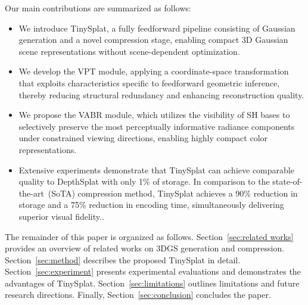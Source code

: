 \documentclass[lettersize,journal]{IEEEtran}
\begin{document}
Our main contributions are summarized as follows:
\begin{itemize}
    \item We introduce TinySplat, a fully feedforward pipeline consisting of Gaussian generation and a novel compression stage, enabling compact 3D Gaussian scene representations without scene-dependent optimization.

    \item We develop the VPT module, applying a coordinate-space transformation that exploits characteristics specific to feedforward geometric inference, thereby reducing structural redundancy and enhancing reconstruction quality.

    \item We propose the VABR module, which utilizes the visibility of SH bases to selectively preserve the most perceptually informative radiance components under constrained viewing directions, enabling highly compact color representations.

    \item Extensive experiments demonstrate that TinySplat can achieve comparable quality to DepthSplat with only 1\% of storage. In comparison to the state-of-the-art~(SoTA) compression method, TinySplat achieves a 90\% reduction in storage and a 75\% reduction in encoding time, simultaneously delivering superior visual fidelity..
\end{itemize}

The remainder of this paper is organized as follows. Section~\ref{sec:related works} provides an overview of related works on 3DGS generation and compression. Section~\ref{sec:method} describes the proposed TinySplat in detail. Section~\ref{sec:experiment} presents experimental evaluations and demonstrates the advantages of TinySplat. Section~\ref{sec:limitations} outlines limitations and future research directions. Finally, Section~\ref{sec:conclusion} concludes the paper.



\end{document}

